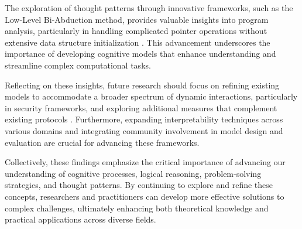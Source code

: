 The exploration of thought patterns through innovative frameworks, such as the Low-Level Bi-Abduction method, provides valuable insights into program analysis, particularly in handling complicated pointer operations without extensive data structure initialization \cite{holk2022lowlevelbiabduction}. This advancement underscores the importance of developing cognitive models that enhance understanding and streamline complex computational tasks.



Reflecting on these insights, future research should focus on refining existing models to accommodate a broader spectrum of dynamic interactions, particularly in security frameworks, and exploring additional measures that complement existing protocols \cite{kammller2020applyingisabelleinsiderframework}. Furthermore, expanding interpretability techniques across various domains and integrating community involvement in model design and evaluation are crucial for advancing these frameworks.



Collectively, these findings emphasize the critical importance of advancing our understanding of cognitive processes, logical reasoning, problem-solving strategies, and thought patterns. By continuing to explore and refine these concepts, researchers and practitioners can develop more effective solutions to complex challenges, ultimately enhancing both theoretical knowledge and practical applications across diverse fields.